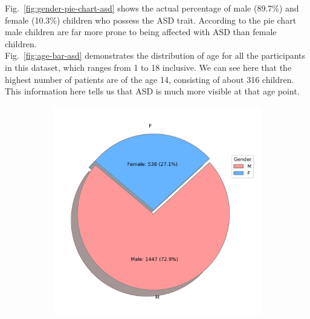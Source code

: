 \documentclass{article}
\begin{document}
\begin{multicols}{2}
    \noindent
    \hspace*{\parindent}Fig.~\ref{fig:gender-pie-chart-asd} shows the actual percentage of male (89.7\%) and female (10.3\%) children who possess the ASD trait. According to the pie chart male children are far more prone to being affected with ASD than female children.\\
    
    \noindent
    \hspace*{\parindent}Fig.~\ref{fig:age-bar-asd} demonstrates the distribution of age for all the participants in this dataset, which ranges from 1 to 18 inclusive. We can see here that the highest number of patients are of the age 14, consisting of about 316 children. This information here tells us that ASD is much more visible at that age point.\\
    \begin{minipage}{\columnwidth}
    \centering
        \begin{figure}[H]
            \begin{subfigure}{\columnwidth}
                \centering
                \includegraphics[width=\textwidth]{images/Gender_Pi_chart.png}
                \caption{}
                \label{fig:gender-pie-chart} %
            \end{subfigure}
            \hfill

\end{figure}
\end{minipage}
\end{multicols}
\end{document}
